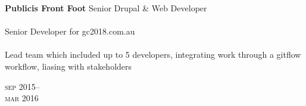 \begin{minipage}[t]{0.70\textwidth}
\textbf{Publicis Front Foot}\phantom{..} Senior Drupal \& Web Developer \\
\\
Senior Developer for gc2018.com.au
\\
\\
Lead team which included up to 5 developers, integrating work through a gitflow workflow, liasing with stakeholders
\\
{\small
\textit{}
\par}
\end{minipage}
\begin{minipage}[t]{0.30\textwidth}
{
\hfill \textsc{sep} 2015--\\ 
\hspace*{0pt} \hfill \textsc{mar} 2016
\par
}
\end{minipage}
\\
\\




